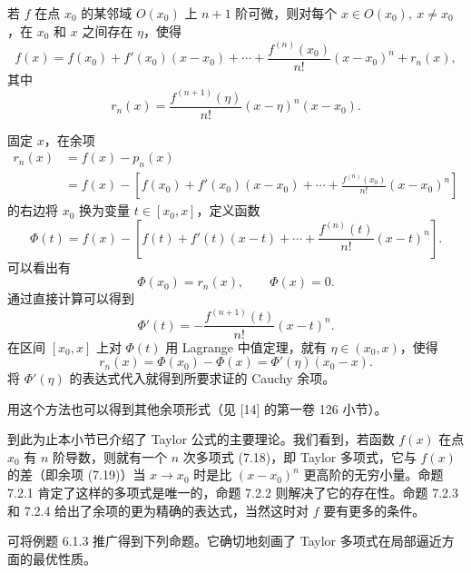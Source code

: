 \begin{xproposition}
若 $f$ 在点 $x_0$ 的某邻域 $O(x_0)$ 上 $n+1$ 阶可微，则对每个 $x\in O(x_0),\ x\neq x_0$，在 $x_0$ 和 $x$ 之间存在 $\eta$，使得
\[
  f(x)=f(x_0)+f'(x_0)(x-x_0)+\cdots+\frac{f^{(n)}(x_0)}{n!}(x-x_0)^n+r_n(x),
\]
其中
\[
  r_n(x)=\frac{f^{(n+1)}(\eta)}{n!}(x-\eta)^n(x-x_0).
\]
\end{xproposition}
\begin{xproof}
固定 $x$，在余项
\[
  \begin{aligned}
  r_n(x)&=f(x)-p_n(x)\\
  &=f(x)-\left[f(x_0)+f'(x_0)(x-x_0)+\cdots+\frac{f^{(n)}(x_0)}{n!}(x-x_0)^n\right]
  \end{aligned}
\]
的右边将 $x_0$ 换为变量 $t\in[x_0,x]$，定义函数
\[
  \Phi(t)=f(x)-\left[f(t)+f'(t)(x-t)+\cdots+\frac{f^{(n)}(t)}{n!}(x-t)^n\right].
\]
可以看出有
\[
  \Phi(x_0)=r_n(x),\qquad \Phi(x)=0.
\]
通过直接计算可以得到
\[
  \Phi'(t)=-\frac{f^{(n+1)}(t)}{n!}(x-t)^n.
\]
在区间 $[x_0,x]$ 上对 $\Phi(t)$ 用 Lagrange 中值定理，就有 $\eta\in(x_0,x)$，使得
\[
  r_n(x)=\Phi(x_0)-\Phi(x)=\Phi'(\eta)(x_0-x).
\]
将 $\Phi'(\eta)$ 的表达式代入就得到所要求证的 Cauchy 余项。
\end{xproof}

\begin{xremark}
用这个方法也可以得到其他余项形式（见 [14] 的第一卷 126 小节）。
\end{xremark}

到此为止本小节已介绍了 Taylor 公式的主要理论。我们看到，若函数 $f(x)$ 在点 $x_0$ 有 $n$ 阶导数，则就有一个 $n$ 次多项式 (7.18)，即 Taylor 多项式，它与 $f(x)$ 的差（即余项 (7.19)）当 $x\to x_0$ 时是比 $(x-x_0)^n$ 更高阶的无穷小量。命题 7.2.1 肯定了这样的多项式是唯一的，命题 7.2.2 则解决了它的存在性。命题 7.2.3 和 7.2.4 给出了余项的更为精确的表达式，当然这时对 $f$ 要有更多的条件。

可将例题 6.1.3 推广得到下列命题。它确切地刻画了 Taylor 多项式在局部逼近方面的最优性质。


